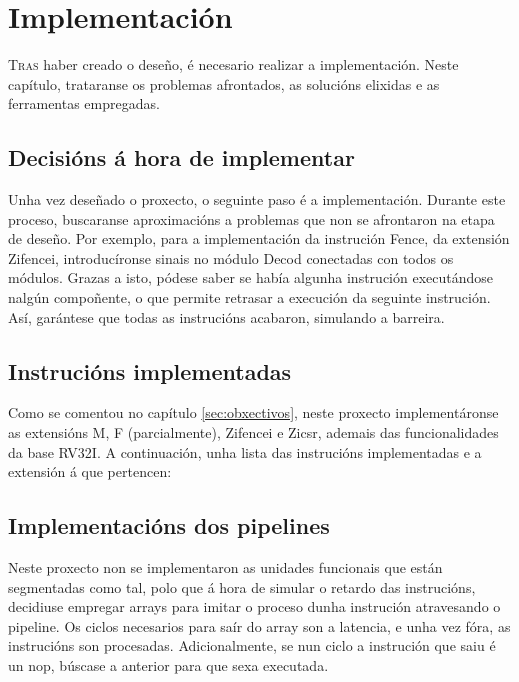 \chapter{Implementación}
\label{chap:implementacion}

\lettrine{T}{ras} haber creado o deseño, é necesario realizar a implementación. Neste capítulo, trataranse os problemas afrontados, as solucións elixidas e as ferramentas empregadas.

\section{Decisións á hora de implementar}\label{sec:decisions}
Unha vez deseñado o proxecto, o seguinte paso é a implementación. Durante este proceso, buscaranse aproximacións a problemas que non se afrontaron na etapa de deseño. Por exemplo, para a implementación da instrución Fence, da extensión Zifencei, introducíronse sinais no módulo Decod conectadas con todos os módulos. Grazas a isto, pódese saber se había algunha instrución executándose nalgún compoñente, o que permite retrasar a execución da seguinte instrución. Así, garántese que todas as instrucións acabaron, simulando a barreira.


\section{Instrucións implementadas}\label{sec:intrucions_implt}
Como se comentou no capítulo \ref{sec:obxectivos}, neste proxecto implementáronse as extensións M, F (parcialmente), Zifencei e Zicsr, ademais das funcionalidades da base RV32I. A continuación, unha lista das instrucións implementadas e a extensión á que pertencen:



\section{Implementacións dos pipelines}\label{sec:implt_pipelines}
Neste proxecto non se implementaron as unidades funcionais que están segmentadas como tal, polo que á hora de simular o retardo das instrucións, decidiuse empregar arrays para imitar o proceso dunha instrución atravesando o pipeline. Os ciclos necesarios para saír do array son a latencia, e unha vez fóra, as instrucións son procesadas. Adicionalmente, se nun ciclo a instrución que saiu é un \acrfull{nop}, búscase a anterior para que sexa executada. 

